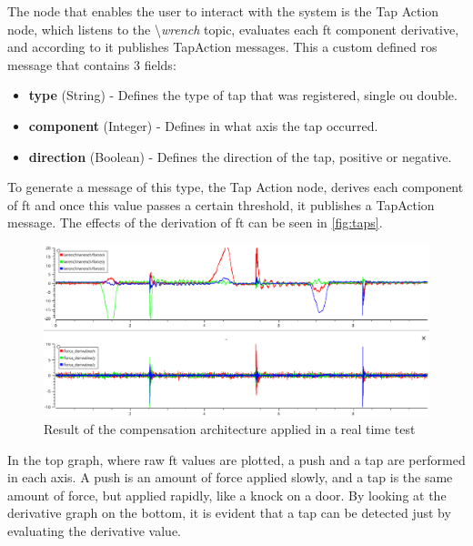 \par The node that enables the user to interact with the system is the Tap Action node, which listens to the \textbackslash\textit{wrench} topic, evaluates each \ac{ft} component derivative, and according to it publishes TapAction messages. This a custom defined \ac{ros} message that contains 3 fields: 

\begin{itemize}
    \item \textbf{type} (String) - Defines the type of tap that was registered, single ou double.
    \item \textbf{component} (Integer) - Defines in what axis the tap occurred.
    \item \textbf{direction} (Boolean) - Defines the direction of the tap, positive or negative.
\end{itemize}

\par To generate a message of this type, the Tap Action node, derives each component of \ac{ft} and once this value passes a certain threshold, it publishes a TapAction message. The effects of the derivation of \ac{ft} can be seen in \autoref{fig:taps}.


\begin{figure}[h]
    \centering
    \includegraphics[width=0.9\linewidth]{figs/chp5/taps.png}
    \caption{Result of the compensation architecture applied in a real time test}
    \label{fig:taps}
\end{figure}

\par In the top graph, where raw \ac{ft} values are plotted, a push and a tap are performed in each axis. A push is an amount of force applied slowly, and a tap is the same amount of force, but applied rapidly, like a knock on a door. By looking at the derivative graph on the bottom, it is evident that a tap can be detected just by evaluating the derivative value. 




